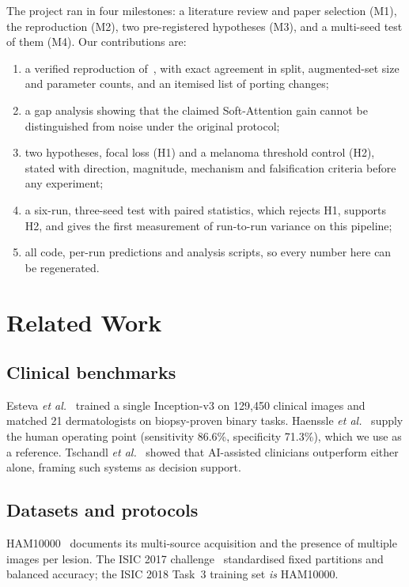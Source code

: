 \documentclass[conference]{IEEEtran}
\begin{document}
The project ran in four milestones: a literature review and paper selection (M1), the reproduction (M2), two pre-registered hypotheses (M3), and a multi-seed test of them (M4). Our contributions are:
\begin{enumerate}
  \item a verified reproduction of~\cite{datta2021}, with exact agreement in split, augmented-set size and parameter counts, and an itemised list of porting changes;
  \item a gap analysis showing that the claimed Soft-Attention gain cannot be distinguished from noise under the original protocol;
  \item two hypotheses, focal loss (H1) and a melanoma threshold control (H2), stated with direction, magnitude, mechanism and falsification criteria before any experiment;
  \item a six-run, three-seed test with paired statistics, which rejects H1, supports H2, and gives the first measurement of run-to-run variance on this pipeline;
  \item all code, per-run predictions and analysis scripts, so every number here can be regenerated.
\end{enumerate}

\section{Related Work}\label{sec:related}
\subsection{Clinical benchmarks}
Esteva \emph{et al.}~\cite{esteva2017} trained a single Inception-v3 on 129,450 clinical images and matched 21 dermatologists on biopsy-proven binary tasks. Haenssle \emph{et al.}~\cite{haenssle2018} supply the human operating point (sensitivity 86.6\%, specificity 71.3\%), which we use as a reference. Tschandl \emph{et al.}~\cite{tschandl2020} showed that AI-assisted clinicians outperform either alone, framing such systems as decision support.

\subsection{Datasets and protocols}
HAM10000~\cite{tschandl2018} documents its multi-source acquisition and the presence of multiple images per lesion. The ISIC 2017 challenge~\cite{codella2018} standardised fixed partitions and balanced accuracy; the ISIC 2018 Task~3 training set \emph{is} HAM10000.
\end{document}
